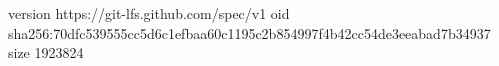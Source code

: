 version https://git-lfs.github.com/spec/v1
oid sha256:70dfc539555cc5d6c1efbaa60c1195c2b854997f4b42cc54de3eeabad7b34937
size 1923824
